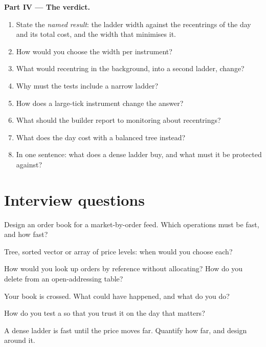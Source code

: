 \begin{problem}
\medskip\noindent\textbf{Part IV --- The verdict.}
\begin{enumerate}[resume]
\item State the \emph{named result}: the ladder width against the recentrings of the day and its total cost, and the width that
minimises it.
\item How would you choose the width per instrument?
\item What would recentring in the background, into a second ladder, change?
\item Why must the tests include a narrow ladder?
\item How does a large-tick instrument change the answer?
\item What should the builder report to monitoring about recentrings?
\item What does the day cost with a balanced tree instead?
\item In one sentence: what does a dense ladder buy, and what must it be protected against?
\end{enumerate}
\end{problem}

\section{Interview questions}

\begin{interviewq}\label{iq:ll:the-order-book-builder:1}
Design an order book for a market-by-order feed. Which operations must be fast, and how fast?
\end{interviewq}

\begin{interviewq}\label{iq:ll:the-order-book-builder:2}
Tree, sorted vector or array of price levels: when would you choose each?
\end{interviewq}

\begin{interviewq}\label{iq:ll:the-order-book-builder:3}
How would you look up orders by reference without allocating? How do you delete from an open-addressing table?
\end{interviewq}

\begin{interviewq}\label{iq:ll:the-order-book-builder:4}
Your book is crossed. What could have happened, and what do you do?
\end{interviewq}

\begin{interviewq}\label{iq:ll:the-order-book-builder:5}
How do you test a  so that you trust it on the day that matters?
\end{interviewq}

\begin{interviewq}\label{iq:ll:the-order-book-builder:6}
A dense ladder is fast until the price moves far. Quantify how far, and design around it.
\end{interviewq}
